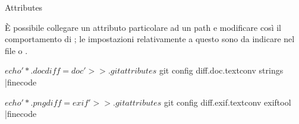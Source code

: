 \capitolo Attributes

\`E possibile collegare un attributo particolare ad un path e modificare cos\`i
il comportamento di \git; le impostazioni relativamente a questo sono da
indicare nel file  o .

\iniziacode
$ echo '*.doc diff=doc' >> .gitattributes
$ git config diff.doc.textconv strings
|finecode

\iniziacode
$ echo '*.png diff=exif' >> .gitattributes
$ git config diff.exif.textconv exiftool
|finecode

